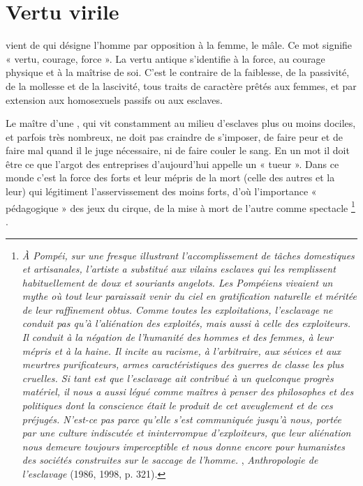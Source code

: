 \section{Vertu virile}

  vient de  qui désigne l'homme par opposition à la femme, le mâle. Ce mot signifie « vertu, courage, force ». La vertu antique s'identifie à la force, au courage physique et à la maîtrise de soi. C'est le contraire de la faiblesse, de la passivité, de la mollesse et de la lascivité, tous traits de caractère prêtés aux femmes, et par extension aux homosexuels passifs ou aux esclaves. 

 Le maître d'une , qui vit constamment au milieu d'esclaves plus ou moins dociles, et parfois très nombreux, ne doit pas craindre de s'imposer, de faire peur et de faire mal quand il le juge nécessaire, ni de faire couler le sang. En un mot il doit être ce que l'argot des entreprises d'aujourd'hui appelle un « tueur ». Dans ce monde c'est la force des forts et leur mépris de la mort (celle des autres et la leur) qui légitiment l'asservissement des moins forts, d'où l'importance « pédagogique » des jeux du cirque, de la mise à mort de l'autre comme spectacle%
\footnote{\emph{À Pompéi, sur une fresque illustrant l'accomplissement de tâches domestiques et artisanales, l'artiste a substitué aux vilains esclaves qui les remplissent habituellement de doux et souriants angelots. Les Pompéiens vivaient un mythe où tout leur paraissait venir du ciel en gratification naturelle et méritée de leur raffinement obtus. Comme toutes les exploitations, l'esclavage ne conduit pas qu'à l'aliénation des exploités, mais aussi à celle des exploiteurs. Il conduit à la négation de l'humanité des hommes et des femmes, à leur mépris et à la haine. Il incite au racisme, à l'arbitraire, aux sévices et aux meurtres purificateurs, armes caractéristiques des guerres de classe les plus cruelles. Si tant est que l'esclavage ait contribué à un quelconque progrès matériel, il nous a aussi légué comme maîtres à penser des philosophes et des politiques dont la conscience était le produit de cet aveuglement et de ces préjugés. N'est-ce pas parce qu'elle s'est communiquée jusqu'à nous, portée par une culture indiscutée et ininterrompue d'exploiteurs, que leur aliénation nous demeure toujours imperceptible et nous donne encore pour humanistes des sociétés construites sur le saccage de l'homme.} , \emph{Anthropologie de l'esclavage} (1986, 1998, p. 321).}%
.

